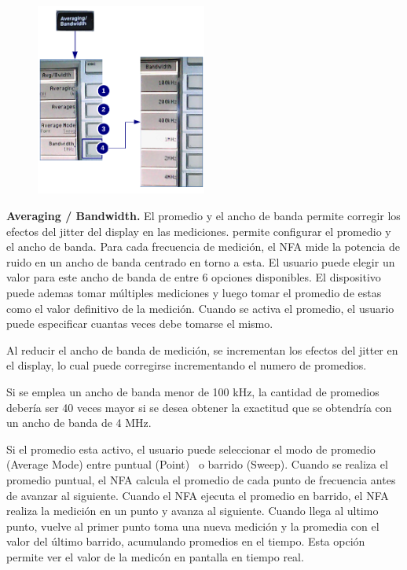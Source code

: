 	\begin{minipage}[t]{\textwidth}
		\begin{figure}	
			\centering	
			\includegraphics[width=0.5\textwidth]{Imagenes/MenuAverageBandwidthN8975A.pdf}	
		\end{figure}

		\textbf{Averaging / Bandwidth.} El promedio y el ancho de banda permite corregir los efectos del jitter del display en las mediciones. permite configurar el promedio y el ancho de banda. Para cada frecuencia de medición, el NFA mide la potencia de ruido en un ancho de banda centrado en torno a esta. El usuario puede elegir un valor para este ancho de banda de entre 6 opciones disponibles. El dispositivo puede ademas tomar múltiples mediciones y luego tomar el promedio de estas como el valor
		definitivo de la medición. Cuando se activa el promedio, el usuario puede especificar cuantas veces debe tomarse el mismo.	
		
		Al reducir el ancho de banda de medición, se incrementan los efectos del jitter en el display, lo cual puede corregirse incrementando el numero de promedios.
		
		Si se emplea un ancho de banda menor de 100 kHz, la cantidad de promedios debería ser 40 veces mayor si se desea obtener	la exactitud que se obtendría con un ancho de banda de 4 MHz.
		
		Si el promedio esta activo, el usuario puede seleccionar el modo de promedio (Average Mode) entre puntual (Point) \ o barrido (Sweep). Cuando se realiza el promedio puntual, el NFA calcula el promedio de	cada punto de frecuencia antes de avanzar al siguiente. Cuando el NFA ejecuta el promedio en barrido, el NFA realiza la	medición en un punto y avanza al siguiente. Cuando llega al ultimo punto, vuelve al primer punto toma una nueva medición y la promedia con el valor del último barrido, acumulando promedios en el tiempo. Esta opción permite ver el valor de la medicón en pantalla en tiempo real.
	\end{minipage}
	
